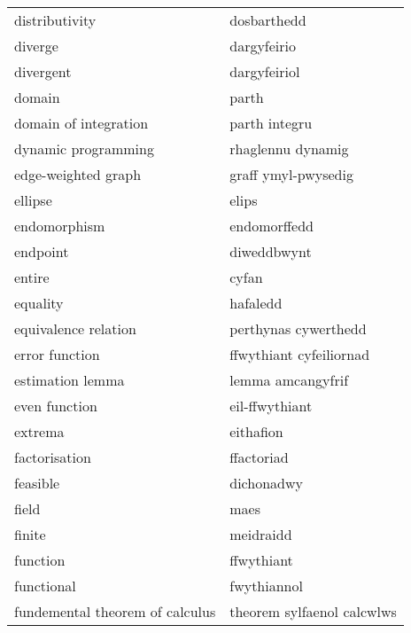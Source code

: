 \begin{supertabular}{p{0.22\textwidth}p{0.22\textwidth}}
                  distributivity &                     dosbarthedd \\
                         diverge &                     dargyfeirio \\
                       divergent &                    dargyfeiriol \\
                          domain &                           parth \\
           domain of integration &                   parth integru \\
             dynamic programming &               rhaglennu dynamig \\
             edge-weighted graph &             graff ymyl-pwysedig \\
                         ellipse &                           elips \\
                    endomorphism &                    endomorffedd \\
                        endpoint &                     diweddbwynt \\
                          entire &                           cyfan \\
                        equality &                        hafaledd \\
            equivalence relation &            perthynas cywerthedd \\
                  error function &         ffwythiant cyfeiliornad \\
                estimation lemma &               lemma amcangyfrif \\
                   even function &                  eil-ffwythiant \\
                         extrema &                       eithafion \\
                   factorisation &                      ffactoriad \\
                        feasible &                      dichonadwy \\
                           field &                            maes \\
                          finite &                       meidraidd \\
                        function &                      ffwythiant \\
                      functional &                     fwythiannol \\
 fundemental theorem of calculus &      theorem sylfaenol calcwlws \\

\end{supertabular}
